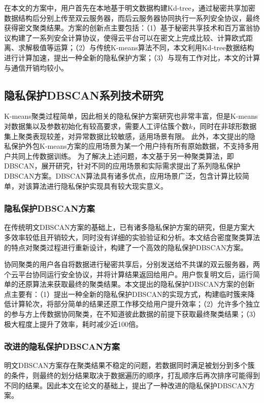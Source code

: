 在本文的方案中，用户首先在本地基于明文数据构建Kd-tree，通过秘密共享加密数据结构后分别上传至双云服务器，而后云服务器协同执行一系列安全协议，最终获得密文聚类结果。方案的创新点主要包括：（1）基于秘密共享技术和百万富翁协议\cite{rathee2020cryptflow2}构建了一系列安全计算协议，使得云平台可以在密文上完成比较、计算欧式距离、求解极值等运算；（2）与传统K-means算法不同，本文利用Kd-tree数据结构进行计算加速，提出一种全新的隐私保护方案；（3）与现有工作对比，本文的计算与通信开销均较小。

\subsection{隐私保护DBSCAN系列技术研究}
K-means聚类过程简单，因此相关的隐私保护方案研究也非常丰富，但是K-means对数据集以及参数初始化有较高要求，需要人工评估簇个数$ k $，同时在非球形数据集上聚类表现较差，对异常数据比较敏感，适用场景有限。
此外，本文提出的隐私保护外包K-means方案的应用场景为某一个用户持有所有原始数据，不支持多用户共同上传数据训练。
为了解决上述问题，本文基于另一种聚类算法，即DBSCAN，展开研究，针对不同的应用场景和实际需求提出了系列隐私保护DBSCAN方案。DBSCAN算法具有诸多优点，应用场景广泛，包含计算比较简单，对该算法进行隐私保护实现具有较大现实意义。

\subsubsection{隐私保护DBSCAN方案}
\label{fanganyi}
在传统明文DBSCAN方案\cite{1996A}的基础上，已有诸多隐私保护方案的研究\cite{2006Privacy,2021Privacy}，但是方案大多效率较低且开销较大，同时没有详细的实验验证和分析。本文结合密度聚类算法的特点对聚类过程进行重新设计，构建了一个高效的隐私保护DBSCAN方案。

协同聚类的用户各自将数据进行秘密共享后，分别发送给不共谋的双云服务器，两个云平台协同运行安全协议，并将计算结果返回给用户。用户恢复明文后，运行简单的还原算法来获取最终的聚类结果。本文提出的隐私保护DBSCAN方案的创新点主要有：（1）提出一种全新的隐私保护DBSCAN的实现方式，构建临时簇来降低计算轮次，将部分简单的结果还原工作移交给用户提升效率；（2）允许多个独立的参与方上传数据协同聚类，在不知道彼此数据的前提下获取最终聚类结果；（3）极大程度上提升了效率，耗时减少近100倍。
\subsubsection{改进的隐私保护DBSCAN方案}
明文DBSCAN方案存在聚类结果不稳定的问题，若数据同时满足被划分到多个簇的条件，则最终的划分结果取决于数据遍历的顺序，打乱顺序后再次排序可能得到不同的结果。因此本文在论文\cite{tran2013revised}的基础上，提出了一种改进的隐私保护DBSCAN方案。

